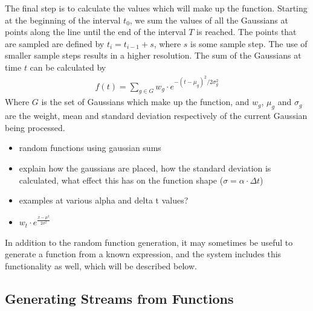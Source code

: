 \documentclass[a4paper,11pt]{article}
\begin{document}
The final step is to calculate the values which will make up the
function. Starting at the beginning of the interval $t_0$, we sum the values of
all the Gaussians at points along the line until the end of the interval $T$ is
reached. The points that are sampled are defined by $t_i=t_{i-1}+s$, where $s$
is some sample step. The use of smaller sample steps results in a higher
resolution. The sum of the Gaussians at time $t$ can be calculated by
\begin{align}
f(t) = \sum_{g\in G}w_g\cdot e^{-(t-\mu_g)^2/2\sigma_g^2}
\end{align}
Where $G$ is the set of Gaussians which make up the function, and $w_g$, $\mu_g$
and $\sigma_g$ are the weight, mean and standard deviation respectively of the
current Gaussian being processed.

\begin{itemize}
\item random functions using gaussian sums
\item explain how the gaussians are placed, how the standard deviation is
   calculated, what effect this has on the function shape
   ($\sigma=\alpha\cdot\Delta t$)
\item examples at various alpha and delta t values?
\item $w_t\cdot e^\frac{{x-\mu}^2}{2\sigma^2}$
\end{itemize}

In addition to the random function generation, it may sometimes be useful to
generate a function from a known expression, and the system includes this
functionality as well, which will be described below.
\subsection{Generating Streams from Functions}
\label{sec-5-2}
\end{document}
